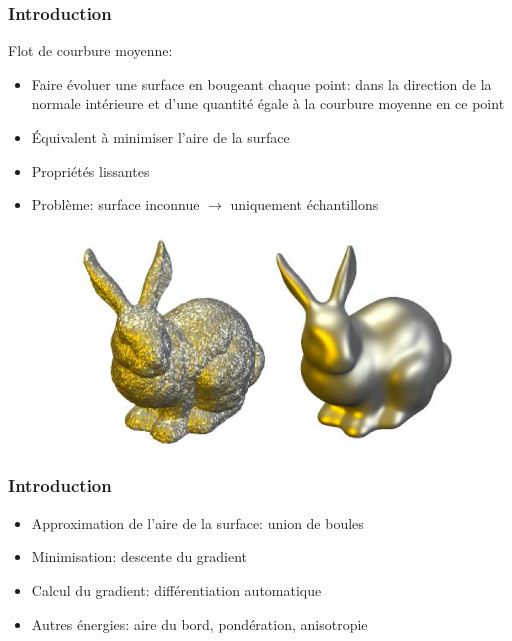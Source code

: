 \documentclass{beamer}
\begin{document}
\begin{frame}
    \frametitle{Introduction}

    Flot de courbure moyenne:
    \begin{itemize}
        \item Faire évoluer une surface en bougeant chaque point: dans la
            direction de la normale intérieure et d'une quantité égale à la
            courbure moyenne en ce point
        \item Équivalent à minimiser l'aire de la surface
        \item Propriétés lissantes
        \item Problème: surface inconnue $ \to $ uniquement échantillons
    \end{itemize}

    \begin{figure}
        \centering
        \includegraphics[scale=0.22]{img/mean-curvature-flow-rabbit}
    \end{figure}
\end{frame}

\begin{frame}
    \frametitle{Introduction}

    \begin{itemize}
        \item Approximation de l'aire de la surface: union de boules
        \item Minimisation: descente du gradient
        \item Calcul du gradient: différentiation automatique
        \item Autres énergies: aire du bord, pondération, anisotropie
    \end{itemize}
\end{frame}
\end{document}
